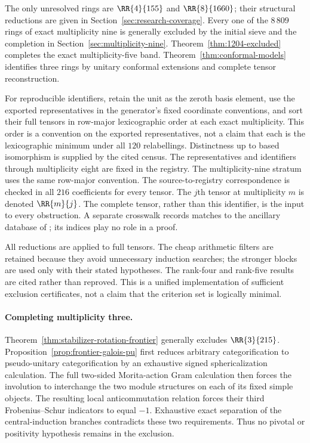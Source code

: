 


The only unresolved rings are $\RR{4}{155}$ and $\RR{8}{1660}$;
their structural reductions are given in Section~\ref{sec:research-coverage}.
Every one of the $8\,809$ rings of exact multiplicity nine is generally
excluded by the initial sieve and the completion in
Section~\ref{sec:multiplicity-nine}.
Theorem~\ref{thm:1204-excluded} completes the exact multiplicity-five band. Theorem~\ref{thm:conformal-models}
identifies three rings by unitary conformal
extensions and complete tensor reconstruction.

For reproducible identifiers, retain the unit as the zeroth basis element,
use the exported representatives in the generator's fixed coordinate
conventions, and sort their full tensors in row-major lexicographic order
at each exact multiplicity. This order is a convention on the exported
representatives, not a claim that each is the lexicographic minimum under
all $120$ relabellings. Distinctness up to based isomorphism is supplied
by the cited census.
The representatives and identifiers through multiplicity eight are fixed in the registry. The multiplicity-nine stratum uses the same row-major convention. The source-to-registry correspondence is checked in all $216$ coefficients for every tensor. The $j$th tensor at multiplicity $m$ is denoted
$\RR{m}{j}$. The complete tensor, rather than this identifier, is the input
to every obstruction. A separate crosswalk records matches to the
ancillary database of \cite{VS}; its indices play no role in a proof.

All reductions are applied to full tensors. The cheap arithmetic filters
are retained because they avoid unnecessary induction searches; the
stronger blocks are used only with their stated hypotheses. The
rank-four and rank-five results are cited rather than reproved. This is
a unified implementation of sufficient exclusion certificates, not a
claim that the criterion set is logically minimal.

\paragraph{Completing multiplicity three.}
Theorem~\ref{thm:stabilizer-rotation-frontier} generally excludes
$\RR{3}{215}$. Proposition~\ref{prop:frontier-galois-pu} first reduces
arbitrary categorification to pseudo-unitary categorification by an
exhaustive signed sphericalization calculation. The full two-sided
Morita-action Gram calculation then forces the involution to interchange
the two module structures on each of its fixed simple objects. The
resulting local anticommutation relation forces their third
Frobenius--Schur indicators to equal $-1$. Exhaustive exact separation
of the central-induction branches contradicts these two requirements.
Thus no pivotal or positivity hypothesis remains in the exclusion.

